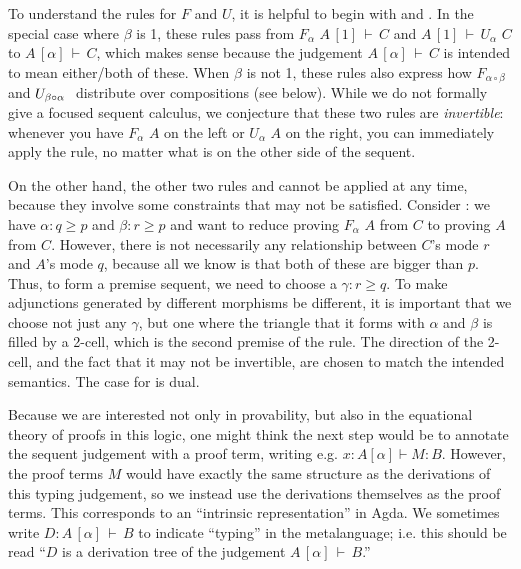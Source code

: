\documentclass{drl-common/llncs}
\newcommand\compo[2]{\ensuremath{#1 \circ #2}}
\newcommand\F[2]{\ensuremath{F_{#1} \,\, #2}}
\newcommand\U[2]{\ensuremath{U_{#1} \,\, #2}}
\newcommand\seq[3]{\ensuremath{#1 \, [ #2 ] \, \vdash \, #3}}
\renewcommand\irl[1]{\dsd{#1}}
\begin{document}
To understand the rules for $F$ and $U$, it is helpful to begin with
\irl{FL} and \irl{UR}.  In the special case where $\beta$ is 1, these
rules pass from \seq{\F {\alpha}{A}}{1}{C} and \seq{A}{1}{\U{\alpha}{C}}
to \seq{A}{\alpha}{C}, which makes sense because the judgement
\seq{A}{\alpha}{C} is intended to mean either/both of these.  When
$\beta$ is not 1, these rules also express how
$\F{\compo{\alpha}{\beta}}{}$ and $\U{\compo{\beta}{\alpha}}$ distribute
over compositions (see below).  While we do not formally give a focused
sequent calculus, we conjecture that these two rules are
\emph{invertible}: whenever you have \F{\alpha}{A} on the left or
\U{\alpha}{A} on the right, you can immediately apply the rule, no
matter what is on the other side of the sequent.

On the other hand, the other two rules \irl{UL} and \irl{FR} cannot be
applied at any time, because they involve some constraints that may not
be satisfied.  Consider \irl{FR}: we have $\alpha : q \ge p$ and $\beta
: r \ge p$ and want to reduce proving \F{\alpha}{A} from $C$ to proving
$A$ from $C$.  However, there is not necessarily any relationship
between $C$'s mode $r$ and $A$'s mode $q$, because all we know is that
both of these are bigger than $p$.  Thus, to form a premise sequent, we
need to choose a $\gamma : r \ge q$.  To make adjunctions generated by
different morphisms be different, it is important that we choose not
just any $\gamma$, but one where the triangle that it forms with
$\alpha$ and $\beta$ is filled by a 2-cell, which is the second premise
of the rule.  The direction of the 2-cell, and the fact that it may not
be invertible, are chosen to match the intended semantics.  The case for
\irl{UR} is dual.

Because we are interested not only in provability, but also in the
equational theory of proofs in this logic, one might think the next step
would be to annotate the sequent judgement with a proof term, writing
e.g. $x : A [ \alpha ] \vdash M : B$.  However, the proof terms $M$
would have exactly the same structure as the derivations of this typing
judgement, so we instead use the derivations themselves as the proof
terms.  This corresponds to an ``intrinsic representation'' in Agda.  We
sometimes write $D : \seq{A}{\alpha}{B}$ to indicate ``typing'' in the
metalanguage; i.e. this should be read ``$D$ is a derivation tree of the
judgement \seq{A}{\alpha}{B}.''
\end{document}

